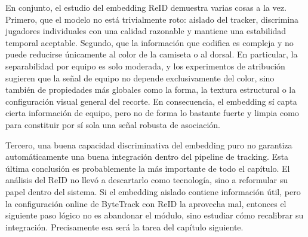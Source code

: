 \documentclass[../MAIN.tex]{subfiles}
\begin{document}
	En conjunto, el estudio del embedding ReID demuestra varias cosas a la vez. Primero, que el modelo no está trivialmente roto: aislado del tracker, discrimina jugadores individuales con una calidad razonable y mantiene una estabilidad temporal aceptable. Segundo, que la información que codifica es compleja y no puede reducirse únicamente al color de la camiseta o al dorsal. En particular, la separabilidad por equipo es solo moderada, y los experimentos de atribución sugieren que la señal de equipo no depende exclusivamente del color, sino también de propiedades más globales como la forma, la textura estructural o la configuración visual general del recorte. En consecuencia, el embedding sí capta cierta información de equipo, pero no de forma lo bastante fuerte y limpia como para constituir por sí sola una señal robusta de asociación.
	
	Tercero, una buena capacidad discriminativa del embedding puro no garantiza automáticamente una buena integración dentro del pipeline de tracking. Esta última conclusión es probablemente la más importante de todo el capítulo. El análisis del ReID no llevó a descartarlo como tecnología, sino a reformular su papel dentro del sistema. Si el embedding aislado contiene información útil, pero la configuración online de ByteTrack con ReID la aprovecha mal, entonces el siguiente paso lógico no es abandonar el módulo, sino estudiar cómo recalibrar su integración. Precisamente esa será la tarea del capítulo siguiente.
	
	\newpage
	
\end{document}

